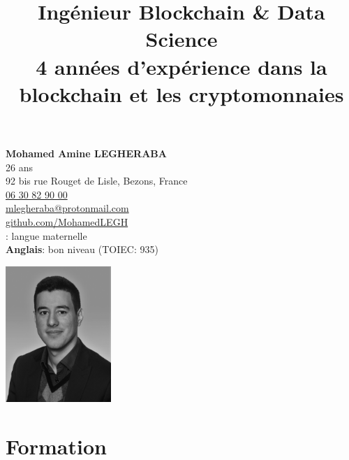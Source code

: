 \documentclass[10pt]{article}
\title{\bfseries{\huge{Ingénieur Blockchain \& Data Science}}\\[0.75cm] \Large{4 années d'expérience dans la blockchain et les cryptomonnaies} }
\author{\bfseries\Huge \vspace{-4ex}}
\date{}
\begin{document}
\begin{minipage}[t]{0.80\textwidth}
\textbf{\Large{Mohamed Amine LEGHERABA}}\\
\vspace{4ex}26 ans\\
92 bis rue Rouget de Lisle, Bezons, France\\
\href{tel:0630829000}{06 30 82 90 00}\\
\href{mailto:mlegheraba@protonmail.com}{mlegheraba@protonmail.com}\\
\href{https://github.com/MohamedLEGH}{github.com/MohamedLEGH}\\
\vspace{5ex}{\bf Français}: langue maternelle \\
{\bf Anglais}: bon niveau (TOIEC: 935) \\
\end{minipage}
\begin{minipage}[t]{0.20\textwidth}
\vspace{-3ex}
\includegraphics[width=4cm]{figures/Legheraba-Mohamed-White.jpg}
\end{minipage}
{\let\newpage\relax\maketitle}
\thispagestyle{empty}

\vspace{-10ex}

\section*{Formation}

\vspace{2ex}
\end{document}
